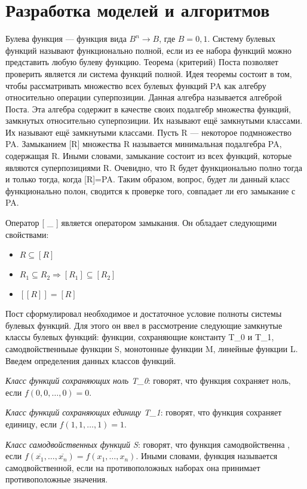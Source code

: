  \chapter{Разработка моделей и алгоритмов }

Булева функция --- функция вида $B^{n} \rightarrow B$, где $B = {0,1}$. 
Систему булевых функций называют функционально полной, если из ее набора 
функций можно представить любую булеву функцию. Теорема (критерий) Поста 
позволяет проверить является ли система функций полной. Идея теоремы состоит 
в том, чтобы рассматривать множество всех булевых функций PA как алгебру 
относительно операции 
суперпозиции. Данная алгебра называется алгеброй Поста. Эта алгебра содержит в 
качестве своих подалгебр множества функций, замкнутых относительно 
суперпозиции. Их называют ещё замкнутыми классами. Их называют ещё замкнутыми 
классами. Пусть R --- некоторое подмножество PA. Замыканием [R] множества  R 
называется минимальная подалгебра PA, содержащая R. Иными словами, замыкание 
состоит из всех функций, которые являются суперпозициями R. Очевидно, что R 
будет функционально полно тогда и только тогда, когда [R]=PA. Таким образом, 
вопрос, будет ли данный класс функционально полон, сводится к проверке того, 
совпадает ли его замыкание с PA.


Оператор [ \_ ] является оператором замыкания. Он обладает следующими свойствами:

\begin{itemize}
	\item $R \subseteq [R]$
	\item $R_{1} \subseteq R_{2} \Rightarrow [R_{1}] \subseteq [R_{2}]$ 
	\item $[[R]] = [R]$
\end{itemize}

Пост сформулировал необходимое и достаточное условие полноты системы булевых 
функций. Для этого он ввел в рассмотрение следующие замкнутые классы булевых 
функций: функции, сохраняющие константу T_{0} и T_{1}, самодвойственныые функции S,
монотонные функции M, линейные функции L. Введем определения данных классов функций.

\textit{Класс функций сохраняющих ноль T_{0}}: говорят, что функция сохраняет ноль, если $f(0, 0, \ldots , 0) = 0$.

\textit{Класс функций сохраняющих единицу T_{1}}: говорят, что функция сохраняет единицу, если $f(1, 1, \ldots , 1) = 1$.

\textit{Класс самодвойственных функций S}: говорят, что функция самодвойственна , если $f(\overline{x_{1}}, \ldots , \overline{x_{n}})=\overline{f(x_{1},\ldots,x_{n})}$. Иными словами, функция называется самодвойственной, если на противоположных наборах она принимает противоположные значения.

